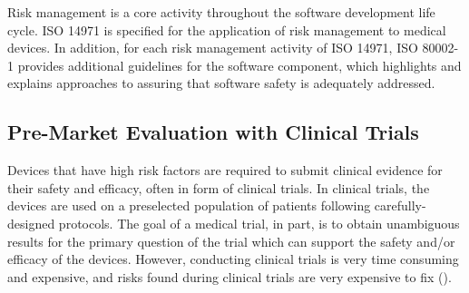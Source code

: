 Risk management is a core activity throughout the software development life cycle.
 ISO 14971 is specified for the application of risk management to medical devices. 
In addition, for each risk management activity of ISO 14971, ISO 80002-1 provides additional guidelines for the software component, which highlights and explains approaches to assuring that software safety is adequately addressed.



\subsection{Pre-Market Evaluation with Clinical Trials}
Devices that have high risk factors are required to submit clinical evidence for their safety and efficacy, often in form of clinical trials. 
In clinical trials, the devices are used on a preselected population of patients following carefully-designed protocols. 
The goal of a medical trial, in part, is to obtain unambiguous results for the primary question of the trial which can support the safety and/or efficacy of the devices. 
However, conducting clinical trials is very time consuming and expensive, and risks found during clinical trials are very expensive to fix (\cite{trialcost}). 





